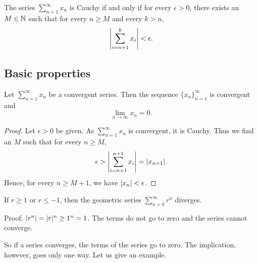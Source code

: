 \begin{prop} \label{prop:cachyser}
The series $\sum_{n=1}^\infty x_n$ is Cauchy
if and only if for every $\epsilon > 0$, 
there exists an $M \in {\mathbb{N}}$ such that for every $n \geq M$
and every $k > n$,
\begin{equation*}
\left\lvert { \sum_{i={n+1}}^k x_i } \right\rvert
< \epsilon .
\end{equation*}
\end{prop}

\subsection{Basic properties}

\begin{prop}
Let $\sum_{n=1}^\infty x_n$ be a convergent series.  Then
the sequence $\{ x_n \}_{n=1}^\infty$ is convergent and
\begin{equation*}
\lim_{n\to\infty} x_n = 0.
\end{equation*}
\end{prop}

\begin{proof}
Let $\epsilon > 0$ be given.  As $\sum_{n=1}^\infty x_n$ is convergent, it is Cauchy.
Thus we find an $M$ such that for every $n \geq M$,
\begin{equation*}
\epsilon > 
\left\lvert { \sum_{i={n+1}}^{n+1} x_i } \right\rvert
=
\lvert { x_{n+1} } \rvert .
\end{equation*}
Hence, for every $n \geq M+1$, we have $\lvert {x_{n}} \rvert < \epsilon$.
\end{proof}

\begin{example}
If $r \geq 1$ or $r \leq -1$, then the geometric series $\sum_{n=0}^\infty r^n$
diverges.

Proof: $\lvert {r^n} \rvert = \lvert {r} \rvert^n \geq 1^n = 1$.  The terms do not go to zero
and the series cannot converge.
\end{example}

So if a series converges, the terms of the series go to zero.
The implication, however, goes only one way.
Let us give an example.

